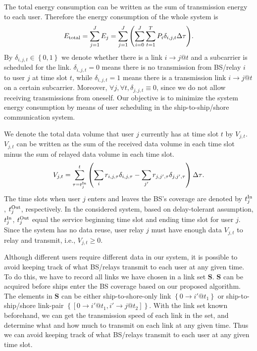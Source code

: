 \documentclass[journal]{IEEEtran}
\begin{document}
 The total energy consumption can be written as the sum of transmission energy to each user. 
 Therefore the energy consumption of the whole system is
 \begin{align}
  {{E_{\rm{total}}} = \sum\limits_{j = 1}^J {{E_j}} = \sum\limits_{j = 1}^J {\left( {\sum\limits_{i=0}^{J}{\sum\limits_{t = 1}^T {{P_{i}}\delta _{i,j,t}} } \Delta \tau  }\right)}}. 
  \end{align}
 By $\delta _{i,j,t} \in \left\{ {0,1} \right\}$ we denote whether there is a link $i \to j @ t$ and a subcarrier is scheduled for the link. $ {{\delta _{i,j,t}}} = 0$ means there is no transmission from BS/relay $i$ to user $j$ at time slot $t$, while $ {{\delta _{i,j,t}}} = 1$ means there is a transmission link $i \to j @ t$ on a certain subcarrier. Moreover, $\forall j,\forall t,{\delta _{j,j,t}} \equiv 0$, since we do not allow receiving transmissions from oneself. 
 Our objective is to minimize the system energy consumption by means of user scheduling in the ship-to-ship/shore communication system. 
 
 We denote the total data volume that user $j$ currently has at time slot $t$ by ${V_{j,t}}$. ${V_{j,t}}$ can be written as the sum of the received data volume in each time slot minus the sum of relayed data volume in each time slot. 
 \begin{align}
  {V_{j,t}} = \sum\limits_{\tau = t_j^{{\rm{In}}}}^t {\left( {\sum\limits_i {{r_{i,j,\tau }\delta _{i,j,\tau}}} - \sum\limits_{j'} {{r_{j,j',\tau }\delta _{j,j',\tau}}} } \right) \Delta \tau } .
 \end{align}
 The time slots when user $j$ enters and leaves the BS's coverage are denoted by $t_j^{{\rm{In}}}$, $t_j^{{\rm{Out}}}$, respectively. In the considered system, based on delay-tolerant assumption, $t_j^{{\rm{In}}}$, $t_j^{{\rm{Out}}}$ equal the service beginning time slot and ending time slot for user $j$. 
 Since the system has no data reuse, user relay $j$ must have enough data ${V_{j,t}}$ to relay and transmit, i.e., ${V_{j,t} \ge 0}$. 

 Although different users require different data in our system, it is possible to avoid keeping track of what BS/relays transmit to each user at any given time. To do this, we have to record all links we have chosen in a link set ${\mathbf{S}}$. ${\mathbf{S}}$ can be acquired before ships enter the BS coverage based on our proposed algorithm. The elements in ${\mathbf{S}}$ can be either ship-to-shore-only link $\left\{0 \to i'@{t_1}\right\}$ or ship-to-ship/shore link-pair $\left\{\left[ {0 \to i'@{t_1},i' \to j@{t_2}} \right]\right\}$. 
 With the link set known beforehand, we can get the transmission speed of each link in the set, and determine what and how much to transmit on each link at any given time. Thus we can avoid keeping track of what BS/relays transmit to each user at any given time slot. 
 
\end{document}
